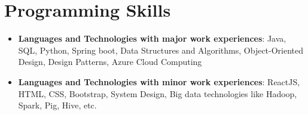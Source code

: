 \documentclass[letterpaper,11pt]{article}
\newcommand{\resumeSubHeadingListStart}{\begin{itemize}[leftmargin=*]}
\newcommand{\resumeSubHeadingListEnd}{\end{itemize}}
\begin{document}

\section{Programming Skills}
 \resumeSubHeadingListStart
    \item{\textbf{Languages and Technologies with major work experiences}{: Java, SQL, Python, Spring boot, Data Structures and Algorithms, Object-Oriented Design, Design Patterns, Azure Cloud Computing}}
    \item{\textbf{Languages and Technologies with minor work experiences}{: ReactJS, HTML, CSS, Bootstrap, System Design, Big data technologies like Hadoop, Spark, Pig, Hive, etc.}}
 \resumeSubHeadingListEnd


\end{document}
